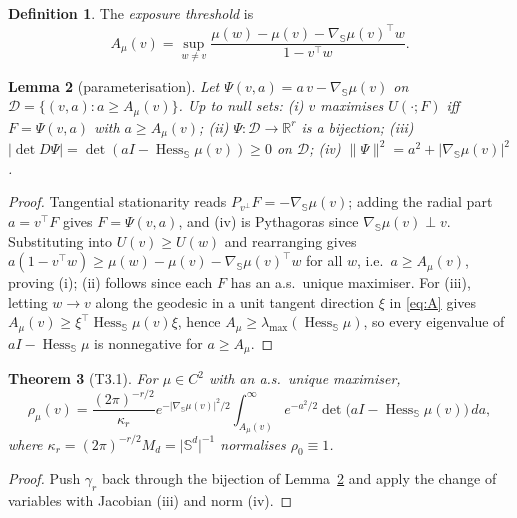 \documentclass[11pt]{article}
\newtheorem{theorem}{Theorem}[section]
\newtheorem{lemma}[theorem]{Lemma}
\theoremstyle{definition}
\newtheorem{definition}[theorem]{Definition}
\DeclareMathOperator{\Hess}{Hess}
\newcommand{\R}{\mathbb{R}}
\newcommand{\Sph}{\mathbb{S}}
\newcommand{\gradS}{\nabla_{\Sph}}
\begin{document}
\begin{definition}
The \emph{exposure threshold} is
\begin{equation}\label{eq:A}
  A_{\mu}(v)=\sup_{w\ne v}
  \frac{\mu(w)-\mu(v)-\gradS\mu(v)^{\top}w}{1-v^{\top}w}.
\end{equation}
\end{definition}

\begin{lemma}[parameterisation]\label{lem:param}
Let $\Psi(v,a)=a\,v-\gradS\mu(v)$ on
$\mathcal{D}=\{(v,a):a\ge A_{\mu}(v)\}$. Up to null sets: \textup{(i)} $v$
maximises $U(\cdot;F)$ iff $F=\Psi(v,a)$ with $a\ge A_{\mu}(v)$;
\textup{(ii)} $\Psi:\mathcal{D}\to\R^{r}$ is a bijection;
\textup{(iii)} $\lvert\det D\Psi\rvert=\det(aI-\Hess_{\Sph}\mu(v))\ge0$ on
$\mathcal{D}$; \textup{(iv)}
$\lVert\Psi\rVert^{2}=a^{2}+\lvert\gradS\mu(v)\rvert^{2}$.
\end{lemma}
\begin{proof}
Tangential stationarity reads $P_{v^{\perp}}F=-\gradS\mu(v)$; adding the radial
part $a=v^{\top}F$ gives $F=\Psi(v,a)$, and (iv) is Pythagoras since
$\gradS\mu(v)\perp v$. Substituting into $U(v)\ge U(w)$ and rearranging gives
$a(1-v^{\top}w)\ge\mu(w)-\mu(v)-\gradS\mu(v)^{\top}w$ for all $w$, i.e.\
$a\ge A_{\mu}(v)$, proving (i); (ii) follows since each $F$ has an a.s.\ unique
maximiser. For (iii), letting $w\to v$ along the geodesic in a unit tangent
direction $\xi$ in \eqref{eq:A} gives
$A_{\mu}(v)\ge\xi^{\top}\Hess_{\Sph}\mu(v)\xi$, hence
$A_{\mu}\ge\lambda_{\max}(\Hess_{\Sph}\mu)$, so every eigenvalue of
$aI-\Hess_{\Sph}\mu$ is nonnegative for $a\ge A_{\mu}$.
\end{proof}

\begin{theorem}[\textsf{T3.1}]\label{thm:exact}
For $\mu\in C^{2}$ with an a.s.\ unique maximiser,
\begin{equation}\label{eq:exact}
  \rho_{\mu}(v)=\frac{(2\pi)^{-r/2}}{\kappa_{r}}
  e^{-\lvert\gradS\mu(v)\rvert^{2}/2}
  \int_{A_{\mu}(v)}^{\infty}e^{-a^{2}/2}
  \det\!\bigl(aI-\Hess_{\Sph}\mu(v)\bigr)\,da ,
\end{equation}
where $\kappa_{r}=(2\pi)^{-r/2}M_{d}=\lvert\Sph^{d}\rvert^{-1}$ normalises
$\rho_{0}\equiv1$.
\end{theorem}
\begin{proof}
Push $\gamma_{r}$ back through the bijection of Lemma~\ref{lem:param} and apply
the change of variables with Jacobian (iii) and norm (iv).
\end{proof}
\end{document}
